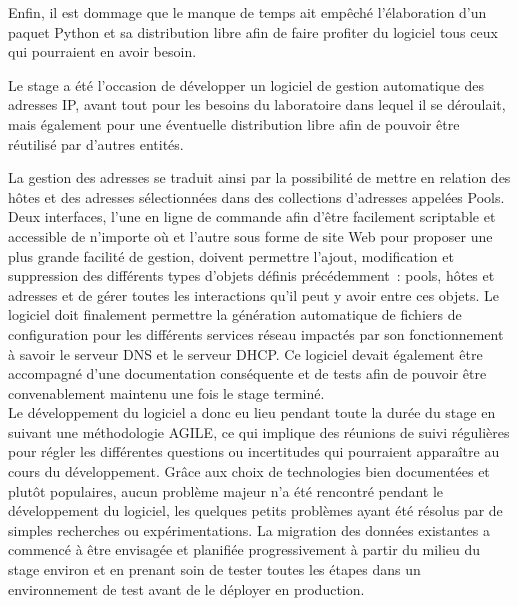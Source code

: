 \documentclass[12pt,a4paper,twoside]{report}
\makeatletter
\renewcommand\chapter{\clearpage\@startsection{chapter}{1}{-0.75em}{\baselineskip}{0.5\baselineskip}{\LARGE\textbf}}
\makeatother
\begin{document}
Enfin, il est dommage que le manque de temps ait empêché l’élaboration d’un
paquet Python et sa distribution libre afin de faire profiter du logiciel tous
ceux qui pourraient en avoir besoin.

\chapter{Conclusion}

Le stage a été l’occasion de développer un logiciel de gestion automatique des
adresses IP, avant tout pour les besoins du laboratoire dans lequel il se
déroulait, mais également pour une éventuelle distribution libre afin de
pouvoir être réutilisé par d’autres entités.

La gestion des adresses se traduit ainsi par la possibilité de mettre en
relation des hôtes et des adresses sélectionnées dans des collections
d’adresses appelées Pools. Deux interfaces, l’une en ligne de commande afin
d’être facilement scriptable et accessible de n’importe où et l’autre sous
forme de site Web pour proposer une plus grande facilité de gestion, doivent
permettre l’ajout, modification et suppression des différents types d’objets
définis précédemment~: pools, hôtes et adresses et de gérer toutes les
interactions qu’il peut y avoir entre ces objets. Le logiciel doit finalement
permettre la génération automatique de fichiers de configuration pour les
différents services réseau impactés par son fonctionnement à savoir le serveur
DNS et le serveur DHCP. Ce logiciel devait également être accompagné d’une
documentation conséquente et de tests afin de pouvoir être convenablement
maintenu une fois le stage terminé.\\

Le développement du logiciel a donc eu lieu pendant toute la durée du stage en
suivant une méthodologie AGILE, ce qui implique des réunions de suivi
régulières pour régler les différentes questions ou incertitudes qui pourraient
apparaître au cours du développement. Grâce aux choix de technologies bien
documentées et plutôt populaires, aucun problème majeur n’a été rencontré
pendant le développement du logiciel, les quelques petits problèmes ayant été
résolus par de simples recherches ou expérimentations. La migration des données
existantes a commencé à être envisagée et planifiée progressivement à partir
du milieu du stage environ et en prenant soin de tester toutes les étapes dans
un environnement de test avant de le déployer en production.\\
\end{document}
